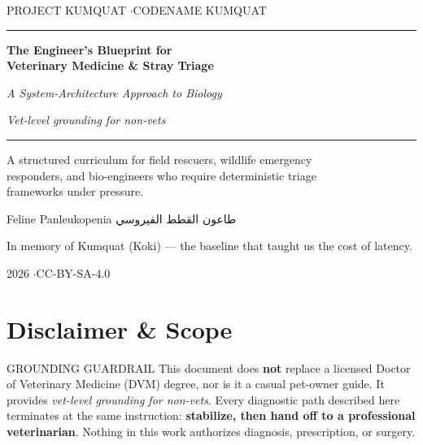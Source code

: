 \documentclass[12pt,oneside]{book}
\newcommand{\ar}[1]{\textarabic{#1}}
\begin{document}
\frontmatter

\begin{titlepage}
\centering
\vspace*{1.2cm}
{\sffamily\color{kumaccent}\large PROJECT KUMQUAT \quad$\cdot$\quad CODENAME KUMQUAT\par}
\vspace{0.4cm}
\rule{\linewidth}{1.2pt}\par
\vspace{0.8cm}
{\Huge\bfseries\color{kumdeep} The Engineer's Blueprint for\\[0.3cm] Veterinary Medicine \& Stray Triage\par}
\vspace{0.6cm}
{\Large\itshape A System-Architecture Approach to Biology\par}
\vspace{0.3cm}
{\large \textit{Vet-level grounding for non-vets}\par}
\vspace{0.8cm}
\rule{\linewidth}{0.5pt}\par
\vspace{1.4cm}
{\large A structured curriculum for field rescuers, wildlife emergency\\
responders, and bio-engineers who require deterministic triage\\
frameworks under pressure.\par}
\vspace{1.6cm}
{\large Feline Panleukopenia \quad \ar{طاعون القطط الفيروسي}\par}
\vfill
{\sffamily\color{kumgrey} In memory of Kumquat (Koki) --- the baseline that taught us the cost of latency.\par}
\vspace{0.6cm}
{\large 2026 \quad$\cdot$\quad CC-BY-SA-4.0\par}
\end{titlepage}

\chapter*{Disclaimer \& Scope}
\thispagestyle{fancy}

\begin{kumbox}{GROUNDING GUARDRAIL}
This document does \textbf{not} replace a licensed Doctor of Veterinary
Medicine (DVM) degree, nor is it a casual pet-owner guide. It provides
\emph{vet-level grounding for non-vets}. Every diagnostic path described
here terminates at the same instruction: \textbf{stabilize, then hand off
to a professional veterinarian}. Nothing in this work authorizes
diagnosis, prescription, or surgery.
\end{kumbox}
\end{document}
